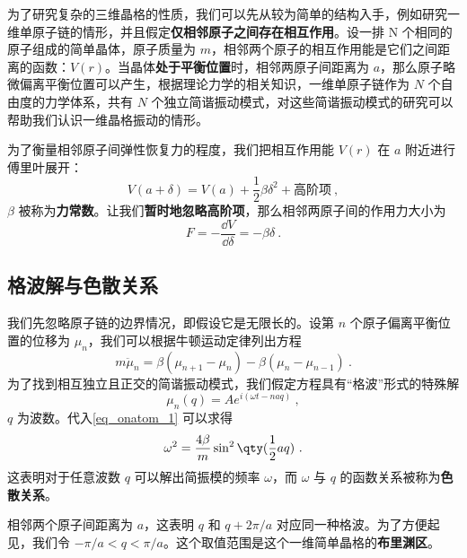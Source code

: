 

为了研究复杂的三维晶格的性质，我们可以先从较为简单的结构入手，例如研究一维单原子链的情形，并且假定\textbf{仅相邻原子之间存在相互作用}。设一排 N 个相同的原子组成的简单晶体，原子质量为 $m$，相邻两个原子的相互作用能是它们之间距离的函数：$V(r)$。当晶体\textbf{处于平衡位置}时，相邻两原子间距离为 $a$，那么原子略微偏离平衡位置可以产生，根据理论力学的相关知识，一维单原子链作为 $N$ 个自由度的力学体系，共有 $N$ 个独立简谐振动模式，对这些简谐振动模式的研究可以帮助我们认识一维晶格振动的情形。

为了衡量相邻原子间弹性恢复力的程度，我们把相互作用能 $V(r)$ 在 $a$ 附近进行傅里叶展开：
\begin{equation}
V(a+\delta)=V(a)+\frac{1}{2}\beta \delta^2+\text{高阶项}~,
\end{equation}
$\beta$ 被称为\textbf{力常数}。让我们\textbf{暂时地忽略高阶项}，那么相邻两原子间的作用力大小为
\begin{equation}
F=-\frac{\dd V}{\dd \delta}=-\beta\delta~.
\end{equation}

\subsection{格波解与色散关系}
我们先忽略原子链的边界情况，即假设它是无限长的。设第 $n$ 个原子偏离平衡位置的位移为 $\mu_n$，我们可以根据牛顿运动定律列出方程
\begin{equation}\label{eq_onatom_1}
m \ddot \mu_n = \beta(\mu_{n+1}-\mu_n)-\beta(\mu_n - \mu_{n-1})~.
\end{equation}
为了找到相互独立且正交的简谐振动模式，我们假定方程具有“格波”形式的特殊解
\begin{equation}\label{eq_onatom_2}
\mu_{n}(q)=Ae^{i(\omega t-naq)}~,
\end{equation}
$q$ 为波数。代入\autoref{eq_onatom_1} 可以求得
\begin{equation}\label{eq_onatom_3}
\omega^2=\frac{4\beta}{m}\sin^2 \qty(\frac{1}{2}aq)~.
\end{equation}
这表明对于任意波数 $q$ 可以解出简振模的频率 $\omega$，而 $\omega$ 与 $q$ 的函数关系被称为\textbf{色散关系}。

相邻两个原子间距离为 $a$，这表明 $q$ 和 $q+2\pi/a$ 对应同一种格波。为了方便起见，我们令 $-\pi/a<q<\pi/a$。这个取值范围是这个一维简单晶格的\textbf{布里渊区}。


